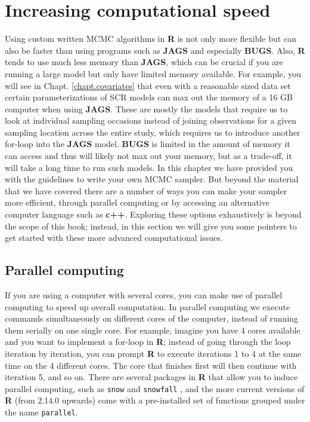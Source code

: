 \section{Increasing computational speed}
Using custom written MCMC algorithms in {\bf R} is not only more flexible but can also be faster than using programs such as {\bf JAGS} and especially {\bf BUGS}. Also, {\bf R} tends to use much less memory than {\bf JAGS}, which can be crucial if you are running a large model but only have limited memory available. For example, you will see in Chapt. \ref{chapt.covariates} that even with a reasonable sized data set certain parameterizations of SCR models can max out the memory of a 16 GB computer when using {\bf JAGS}. These are mostly the models that require us to look at individual sampling occasions instead of joining observations for a given sampling location across the entire study, which requires us to introduce another for-loop into the {\bf JAGS} model. {\bf BUGS} is limited in the amount of memory it can access and thus will likely not max out your memory, but as a trade-off, it will take a long time to run such models. In this chapter we have provided you with the guidelines to write your own MCMC sampler. But beyond the material that we have covered there are a number of ways you can make your sampler more efficient, through parallel computing or by accessing an alternative computer language such as {\bf c++}. Exploring these options exhaustively is beyond the scope of this book; instead, in this section we will give you some pointers to get started with these more advanced computational issues.

\subsection{Parallel computing}
If you are using a computer with several cores, you can make use of parallel computing to speed up overall computation. In parallel computing we execute commands simultaneously on different cores of the computer, instead of running them serially on one single core. For example, imagine you have 4 cores available and you want to implement a for-loop in {\bf R}; instead of going through the loop iteration by iteration, you can prompt {\bf R} to execute iterations 1 to 4 at the same time on the 4 different cores. The core that finishes first will then continue with iteration 5, and so on.  There are several packages in {\bf R} that allow you to induce parallel computing, such as {\tt snow} \citep{tierney_etal:2011} and {\tt snowfall} \citep{knaus:2010}, and the more current versions of {\bf R} (from 2.14.0 upwards) come with a pre-installed set of functions grouped under the name {\tt parallel}.

